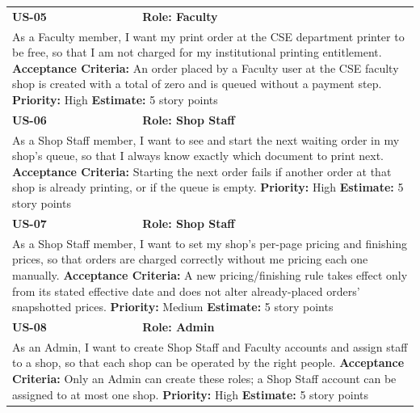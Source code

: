 \documentclass[12pt,a4paper]{report}
\begin{document}
\begin{center}
\begin{longtable}{|p{1.6cm}|p{11.7cm}|}
\textbf{US-05} & \textbf{Role: Faculty} \\
\multicolumn{2}{|p{13.3cm}|}{As a Faculty member, I want my print order at the CSE department printer to be free, so that I am not charged for my institutional printing entitlement. \newline \textbf{Acceptance Criteria:} An order placed by a Faculty user at the CSE faculty shop is created with a total of zero and is queued without a payment step. \newline \textbf{Priority:} High \quad \textbf{Estimate:} 5 story points} \\ \hline

\textbf{US-06} & \textbf{Role: Shop Staff} \\
\multicolumn{2}{|p{13.3cm}|}{As a Shop Staff member, I want to see and start the next waiting order in my shop's queue, so that I always know exactly which document to print next. \newline \textbf{Acceptance Criteria:} Starting the next order fails if another order at that shop is already printing, or if the queue is empty. \newline \textbf{Priority:} High \quad \textbf{Estimate:} 5 story points} \\ \hline

\textbf{US-07} & \textbf{Role: Shop Staff} \\
\multicolumn{2}{|p{13.3cm}|}{As a Shop Staff member, I want to set my shop's per-page pricing and finishing prices, so that orders are charged correctly without me pricing each one manually. \newline \textbf{Acceptance Criteria:} A new pricing/finishing rule takes effect only from its stated effective date and does not alter already-placed orders' snapshotted prices. \newline \textbf{Priority:} Medium \quad \textbf{Estimate:} 5 story points} \\ \hline

\textbf{US-08} & \textbf{Role: Admin} \\
\multicolumn{2}{|p{13.3cm}|}{As an Admin, I want to create Shop Staff and Faculty accounts and assign staff to a shop, so that each shop can be operated by the right people. \newline \textbf{Acceptance Criteria:} Only an Admin can create these roles; a Shop Staff account can be assigned to at most one shop. \newline \textbf{Priority:} High \quad \textbf{Estimate:} 5 story points} \\ \hline


\end{longtable}
\end{center}
\end{document}
